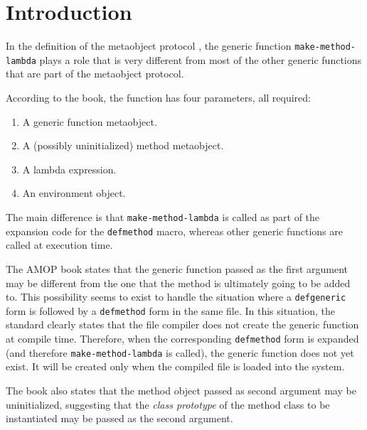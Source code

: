 \section{Introduction}

In the definition of the \commonlisp{} \cite{ansi:common:lisp}
metaobject protocol \cite{Kiczales:1991:AMP:574212}, the generic
function \texttt{make-method-lambda} plays a role that is very
different from most of the other generic functions that are part of
the metaobject protocol.

According to the book, the function has four parameters, all required:

\begin{enumerate}
\item A generic function metaobject.
\item A (possibly uninitialized) method metaobject.
\item A lambda expression.
\item An environment object.
\end{enumerate}

The main difference is that \texttt{make-method-lambda} is called as
part of the expansion code for the \texttt{defmethod} macro, whereas
other generic functions are called at execution time.

The AMOP book states that the generic function passed as the first
argument may be different from the one that the method is ultimately
going to be added to.  This possibility seems to exist to handle the
situation where a \texttt{defgeneric} form is followed by a
\texttt{defmethod} form in the same file.  In this situation, the
\commonlisp{} standard clearly states that the file compiler does not
create the generic function at compile time.  Therefore, when the
corresponding \texttt{defmethod} form is expanded (and therefore
\texttt{make-method-lambda} is called), the generic function does not
yet exist.  It will be created only when the compiled file is loaded
into the \commonlisp{} system.

The book also states that the method object passed as second argument
may be uninitialized, suggesting that the \emph{class prototype} of
the method class to be instantiated may be passed as the second
argument.
